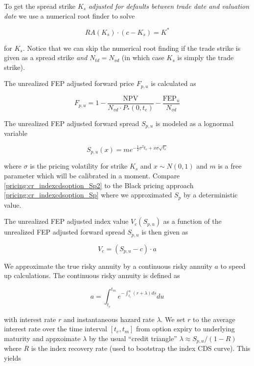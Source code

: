 To get the spread strike $K_s$ {\em adjusted for defaults between trade date and valuation date} we use a numerical root
finder to solve

\begin{equation}
RA(K_s) \cdot (c - K_s) = K^*
\end{equation}

for $K_s$. Notice that we can skip the numerical root finding if the trade strike is given as a spread strike {\em and}
$N_{td} = N_{vd}$ (in which case $K_s$ is simply the trade strike).

The unrealized FEP adjusted forward price $F_{p,u}$ is calculated as

\begin{equation}\label{pricing:cr_indexcdsoption_ufep_adjusted_forward}
F_{p,u} = 1- \frac{\text{NPV}}{N_{vd} \cdot P_{*}(0,t_e)} - \frac{\text{FEP}_u}{N_{vd}}
\end{equation}

The unrealized FEP adjusted forward spread $S_{p,u}$ is modeled as a lognormal variable

\begin{equation}\label{pricing:cr_indexcdsoption_Sp2}
S_{p,u}(x) = m e^{-\frac{1}{2} \sigma^2 t_e + x \sigma \sqrt{t_e}}
\end{equation}

where $\sigma$ is the pricing volatility for strike $K_s$ and $x \sim N(0,1)$ and $m$ is a free parameter which will be
calibrated in a moment. Compare \ref{pricing:cr_indexcdsoption_Sp2} to the Black pricing
approach \ref{pricing:cr_indexcdsoption_Sp} where we approximated $S_p$ by a deterministic value.

The unrealized FEP adjusted index value $V_c(S_{p,u})$ as a function of the unrealized FEP adjusted forward spread
$S_{p,u}$ is then given as

\begin{equation}
V_c = (S_{p,u} - c)\cdot a
\end{equation}

We approximate the true risky annuity by a continuous risky annuity $a$ to speed up calculations. The continuous risky
annuity is defined as

\begin{equation}
a = \int_{t_e}^{t_m} e^{-\int_{t_e}^u (r + \lambda) ds} du
\end{equation}

with interest rate $r$ and instantaneous hazard rate $\lambda$. We set $r$ to the average interest rate over the time
interval $[t_e, t_m]$ from option expiry to underlying maturity and appxoimate $\lambda$ by the usual ``credit
triangle'' $\lambda \approx S_{p,u}/(1-R)$ where $R$ is the index recovery rate (used to bootstrap the index CDS
curve). This yields

